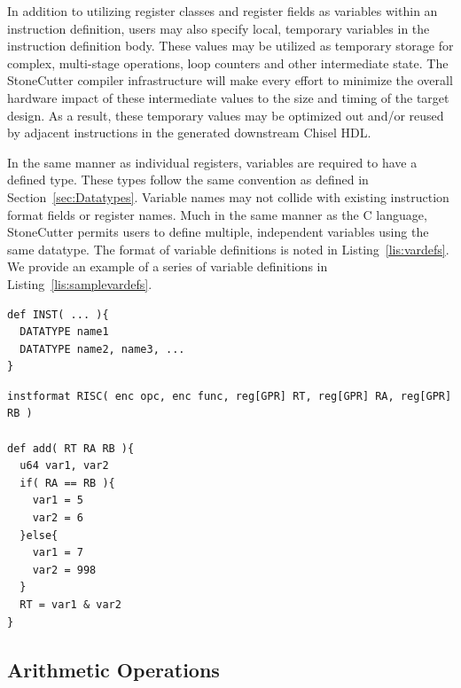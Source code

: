 \documentclass{article}
\begin{document}
In addition to utilizing register classes and register fields as variables within 
an instruction definition, users may also specify local, temporary variables 
in the instruction definition body.  These values may be utilized as temporary 
storage for complex, multi-stage operations, loop counters and other intermediate 
state.  The StoneCutter compiler infrastructure will make every effort to minimize the overall 
hardware impact of these intermediate values to the size and timing of the target design.  As a result, 
these temporary values may be optimized out and/or reused by adjacent instructions 
in the generated downstream Chisel HDL.  

In the same manner as individual registers, variables are required to have a defined type.  
These types follow the same convention as defined in Section~\ref{sec:Datatypes}.  Variable 
names may not collide with existing instruction format fields or register names.  Much in the same 
manner as the C language, StoneCutter permits users to define multiple, independent variables 
using the same datatype.  The format of 
variable definitions is noted in Listing~\ref{lis:vardefs}.  We provide an example of a series of 
variable definitions in Listing~\ref{lis:samplevardefs}.  

\vspace{0.125in}
\begin{lstlisting}[frame=single,style=base,caption={Variable Definitions},captionpos=b,label={lis:vardefs}]
def INST( ... ){
  DATATYPE name1
  DATATYPE name2, name3, ...
}
\end{lstlisting}

\vspace{0.125in}
\begin{lstlisting}[frame=single,style=base,caption={Sample Variable Definitions},captionpos=b,label={lis:samplevardefs}]
instformat RISC( enc opc, enc func, reg[GPR] RT, reg[GPR] RA, reg[GPR] RB )

def add( RT RA RB ){
  u64 var1, var2
  if( RA == RB ){
    var1 = 5
    var2 = 6
  }else{
    var1 = 7
    var2 = 998
  }
  RT = var1 & var2
}
\end{lstlisting}

\clearpage
\subsection{Arithmetic Operations}
\label{sec:Arithmetic Operations}
\end{document}
